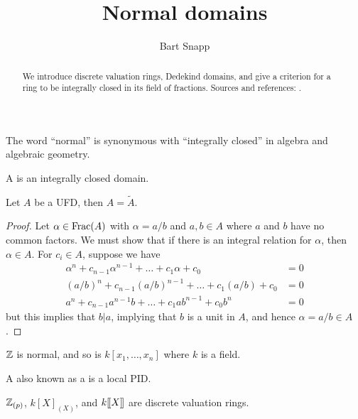 \documentclass{ximera}
\author{Bart Snapp}
\title{Normal domains}
\begin{document}
\begin{abstract}
  We introduce discrete valuation rings, Dedekind domains, and give a
  criterion for a ring to be integrally closed in its field of
  fractions. Sources and references: \cite{jpS2000}.
\end{abstract}
\maketitle



The word ``normal'' is synonymous with ``integrally closed'' in
algebra and algebraic geometry.

\begin{definition}
  A  is an integrally closed domain.
\end{definition}



\begin{theorem}
  Let $A$ be a UFD, then $A = \tilde{A}$.
  \begin{proof}
    Let $\alpha \in \operatorname{Frac}(A)$ with $\alpha = a/b$ and $a,b\in A$ where
    $a$ and $b$ have no common factors.  We must show that if there is
    an integral relation for $\alpha$, then $\alpha\in A$. For $c_i\in
    A$, suppose we have
    \begin{align*}
      \alpha^n + c_{n-1} \alpha^{n-1}+ \dots + c_1 \alpha + c_0 &= 0 \\
      (a/b)^n + c_{n-1} (a/b)^{n-1}+ \dots + c_1 (a/b) + c_0 &= 0 \\
      a^n + c_{n-1} a^{n-1}b+ \dots + c_1 ab^{n-1} + c_0b^n &= 0
    \end{align*}
    but this implies that $b|a$, implying that $b$ is a unit in $A$,
    and hence $\alpha = a/b\in A$.
  \end{proof}
\end{theorem}

\begin{corollary}
  $\mathbb Z$ is normal, and so is $k[x_1,\dots,x_n]$ where $k$ is a field.
\end{corollary}


\begin{definition}
  A  also known as a  is a local
  PID.
\end{definition}

\begin{example}
  $\mathbb Z_{(p)}$, $k[X]_{(X)}$, and $k[\hspace{-0.25ex}[ X]\hspace{-0.25ex}]$ are discrete valuation
  rings.
\end{example}
\end{document}
